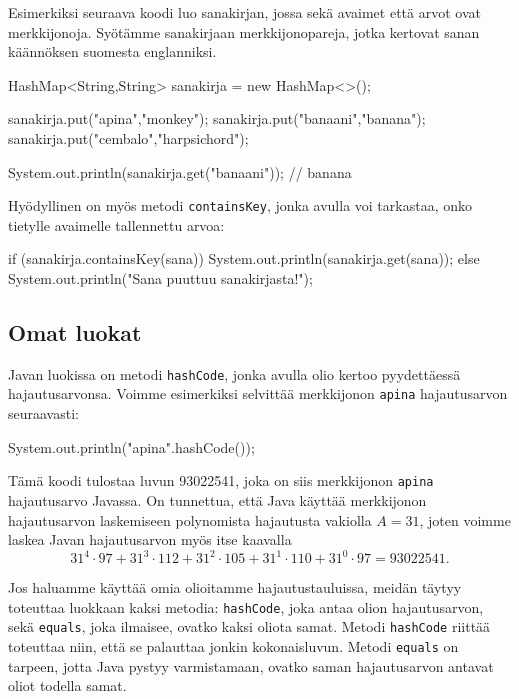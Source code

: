 Esimerkiksi seuraava koodi luo sanakirjan, jossa sekä
avaimet että arvot ovat merkkijonoja.
Syötämme sanakirjaan merkkijonopareja, jotka kertovat
sanan käännöksen suomesta englanniksi.

\begin{code}
HashMap<String,String> sanakirja = new HashMap<>();

sanakirja.put("apina","monkey");
sanakirja.put("banaani","banana");
sanakirja.put("cembalo","harpsichord");

System.out.println(sanakirja.get("banaani")); // banana
\end{code}

Hyödyllinen on myös metodi \texttt{containsKey},
jonka avulla voi tarkastaa, onko tietylle avaimelle
tallennettu arvoa:

\begin{code}
if (sanakirja.containsKey(sana)) {
    System.out.println(sanakirja.get(sana));
} else {
    System.out.println("Sana puuttuu sanakirjasta!");
}
\end{code}

\subsection{Omat luokat}

Javan luokissa on metodi \texttt{hashCode},
jonka avulla olio kertoo pyydettäessä hajautusarvonsa.
Voimme esimerkiksi selvittää merkkijonon \texttt{apina}
hajautusarvon seuraavasti:

\begin{code}
System.out.println("apina".hashCode());
\end{code}

Tämä koodi tulostaa luvun 93022541,
joka on siis merkkijonon \texttt{apina} hajautusarvo Javassa.
On tunnettua, että Java käyttää merkkijonon hajautusarvon laskemiseen
polynomista hajautusta vakiolla $A=31$,
joten voimme laskea Javan hajautusarvon myös itse kaavalla
\[31^4 \cdot 97+31^3 \cdot 112+31^2 \cdot 105+31^1 \cdot 110+31^0 \cdot 97=93022541.\]

Jos haluamme käyttää omia olioitamme hajautustauluissa,
meidän täytyy toteuttaa luokkaan kaksi metodia:
\texttt{hashCode}, joka antaa olion hajautusarvon,
sekä \texttt{equals},
joka ilmaisee, ovatko kaksi oliota samat.
Metodi \texttt{hashCode} riittää toteuttaa niin,
että se palauttaa jonkin kokonaisluvun.
Metodi \texttt{equals} on tarpeen,
jotta Java pystyy varmistamaan, ovatko saman hajautusarvon
antavat oliot todella samat.

